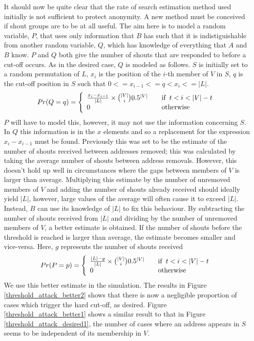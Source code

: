 \documentclass[ %
                    author={Luke Murray},
                supervisor={Dr. Simon Hollis},
                     title={Shadow Peer-to-Peer Networks},
                  subtitle={},
                    degree={MEng},
                      year={2013} ]{thesis}
\begin{document}
It should now be quite clear that the rate of search estimation method used initially is not sufficient to protect anonymity. A new method must be conceived if shout groups are to be at all useful. The aim here is to model a random variable, $P$, that uses only information that $B$ has such that it is indistiguishable from another random variable, $Q$, which has knowledge of everything that $A$ and $B$ know. $P$ and $Q$ both give the number of shouts that are responded to before a cut-off occurs. As in the desired case, $Q$ is modeled as follows. $S$ is initially set to a random permutation of $L$, $x_i$ is the position of the $i$-th member of $V$ in $S$, $q$ is the cut-off position in $S$ such that $0 <= x_{i-1} <= q < x_i <= |L|$.
\[Pr(Q = q) = \left\{
    \begin{array}{l l}
        \frac{x_i - x_{i-1}}{|L|} \times {|V| \choose i}0.5^{|V|} & \quad \text{if}\;\;t < i < |V| - t\\
        0 & \quad \text{otherwise}
    \end{array}
\right.\]
$P$ will have to model this, however, it may not use the information concerning $S$. In $Q$ this information is in the $x$ elements and so a replacement for the expression ${x_i - x_{i-1}}$ must be found. Previously this was set to be the estimate of the number of shouts received between addresses removed; this was calculated by taking the average number of shouts between address removals. However, this doesn't hold up well in circumstances where the gaps between members of $V$ is larger than average. Multiplying this estimate by the number of unremoved members of $V$ and adding the number of shouts already received should ideally yield $|L|$, however, large values of the average will often cause it to exceed $|L|$. Instead, $B$ can use its knowledge of $|L|$ to fix this behaviour. By subtracting the number of shouts received from $|L|$ and dividing by the number of unremoved members of $V$, a better estimate is obtained. If the number of shouts before the threshold is reached is larger than average, the estimate becomes smaller and vice-versa. Here, $g$ represents the number of shouts received 
\[Pr(P = p) = \left\{
    \begin{array}{l l}
        \frac{|L| - g}{|L|} \times {|V| \choose i}0.5^{|V|} & \quad \text{if}\;\;t < i < |V| - t\\
        0 & \quad \text{otherwise}
    \end{array}
\right.\]
We use this better estimate in the simulation. The results in Figure \ref{threshold_attack_better2} shows that there is now a negligible proportion of cases which trigger the hard cut-off, as desired. Figure \ref{threshold_attack_better1} shows a similar result to that in Figure \ref{threshold_attack_desired1}, the number of cases where an address appears in $S$ seems to be independent of its membership in $V$.
\end{document}
